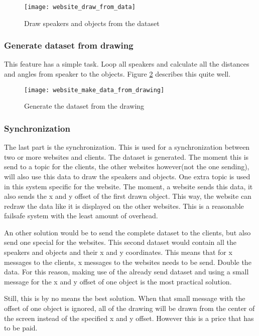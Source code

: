 \begin{figure}[H]
    \centering
    \texttt{[image: website\_draw\_from\_data]}
    \caption{Draw speakers and objects from the dataset}
    \label{fig:website_draw_from_data}
\end{figure}

\subsubsection{Generate dataset from drawing}
This feature has a simple task.
Loop all speakers and calculate all the distances and angles from speaker to the objects.
Figure \ref{fig:website_make_data_from_drawing} describes this quite well.

\begin{figure}[H]
    \centering
    \texttt{[image: website\_make\_data\_from\_drawing]}
    \caption{Generate the dataset from the drawing}
    \label{fig:website_make_data_from_drawing}
\end{figure}

\subsubsection{Synchronization}
The last part is the synchronization. This is used for a synchronization between two or more websites and clients.
The dataset is generated.
The moment this is send to a topic for the clients, the other websites however(not the one sending), will also use this data to draw the speakers and objects.
One extra topic is used in this system specific for the website.
The moment, a website sends this data, it also sends the x and y offset of the first drawn object.
This way, the website can redraw the data like it is displayed on the other websites.
This is a reasonable failsafe system with the least amount of overhead.

An other solution would be to send the complete dataset to the clients, but also send one special for the websites.
This second dataset would contain all the speakers and objects and their x and y coordinates.
This means that for x messages to the clients, x messages to the websites needs to be send.
Double the data.
For this reason, making use of the already send dataset and using a small message for the x and y offset of one object is the most practical solution.

Still, this is by no means the best solution.
When that small message with the offset of one object is ignored, all of the drawing will be drawn from the center of the screen instead of the specified x and y offset.
However this is a price that has to be paid.

